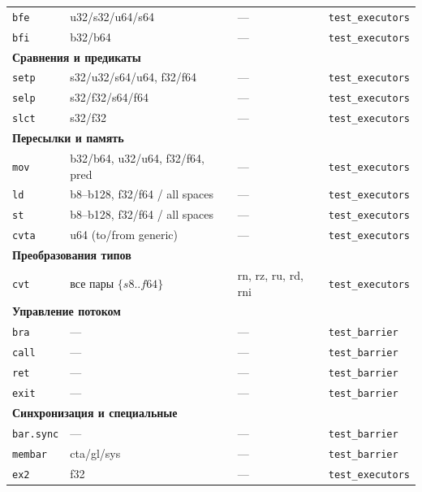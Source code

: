\begin{longtable}{p{4cm} p{5cm} p{2cm} p{3.5cm}}
  \texttt{bfe}  & u32/s32/u64/s64                    & ---  & \texttt{test\_executors} \\
  \texttt{bfi}  & b32/b64                            & ---  & \texttt{test\_executors} \\
  \midrule
  \multicolumn{4}{l}{\textbf{Сравнения и предикаты}} \\
  \texttt{setp} & s32/u32/s64/u64, f32/f64           & ---  & \texttt{test\_executors} \\
  \texttt{selp} & s32/f32/s64/f64                    & ---  & \texttt{test\_executors} \\
  \texttt{slct} & s32/f32                            & ---  & \texttt{test\_executors} \\
  \midrule
  \multicolumn{4}{l}{\textbf{Пересылки и память}} \\
  \texttt{mov}  & b32/b64, u32/u64, f32/f64, pred    & ---  & \texttt{test\_executors} \\
  \texttt{ld}   & b8--b128, f32/f64 / all spaces     & ---  & \texttt{test\_executors} \\
  \texttt{st}   & b8--b128, f32/f64 / all spaces     & ---  & \texttt{test\_executors} \\
  \texttt{cvta} & u64 (to/from generic)              & ---  & \texttt{test\_executors} \\
  \midrule
  \multicolumn{4}{l}{\textbf{Преобразования типов}} \\
  \texttt{cvt}  & все пары $\{s8..f64\}$             & rn, rz, ru, rd, rni & \texttt{test\_executors} \\
  \midrule
  \multicolumn{4}{l}{\textbf{Управление потоком}} \\
  \texttt{bra}  & ---                                & ---  & \texttt{test\_barrier} \\
  \texttt{call} & ---                                & ---  & \texttt{test\_barrier} \\
  \texttt{ret}  & ---                                & ---  & \texttt{test\_barrier} \\
  \texttt{exit} & ---                                & ---  & \texttt{test\_barrier} \\
  \midrule
  \multicolumn{4}{l}{\textbf{Синхронизация и специальные}} \\
  \texttt{bar.sync}  & ---             & ---  & \texttt{test\_barrier} \\
  \texttt{membar}    & cta/gl/sys      & ---  & \texttt{test\_barrier} \\
  \texttt{ex2}       & f32             & ---  & \texttt{test\_executors} \\

\end{longtable}
